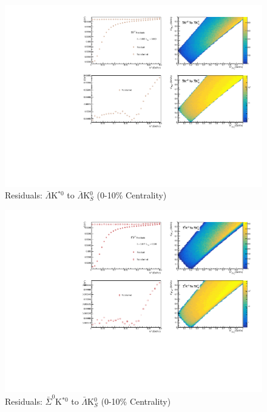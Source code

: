 \documentclass[../AnalysisNoteJBuxton.tex]{subfiles}
\begin{document}
\begin{figure}[h]
  \centering
  \includegraphics[width=\textwidth]{9_AdditionalFigures/Figures/Residuals/ALamK0/Residuals_ALamK0_0010_ALamKSt0ToALamK0_MomResCrctn_NonFlatBgdCrctn_SingleLamParam_10Res_PrimMaxDecay4fm_UsingXiDataAndCoulombOnly.pdf}
  \caption[Residuals: $\bar{\Lambda}$K$^{*0}$ to $\bar{\Lambda}$K$^{0}_{S}$ (0-10\% Centrality)]{Residuals: $\bar{\Lambda}$K$^{*0}$ to $\bar{\Lambda}$K$^{0}_{S}$ (0-10\% Centrality)}
  \label{fig:Res_ALamK0_0010_ALamKSt0}
\end{figure}


\begin{figure}[h]
  \centering
  \includegraphics[width=\textwidth]{9_AdditionalFigures/Figures/Residuals/ALamK0/Residuals_ALamK0_0010_ASigma0KSt0ToALamK0_MomResCrctn_NonFlatBgdCrctn_SingleLamParam_10Res_PrimMaxDecay4fm_UsingXiDataAndCoulombOnly.pdf}
  \caption[Residuals: $\bar{\Sigma}^{0}$K$^{*0}$ to $\bar{\Lambda}$K$^{0}_{S}$ (0-10\% Centrality)]{Residuals: $\bar{\Sigma}^{0}$K$^{*0}$ to $\bar{\Lambda}$K$^{0}_{S}$ (0-10\% Centrality)}
  \label{fig:Res_ALamK0_0010_ASig0KSt0}
\end{figure}
\end{document}
